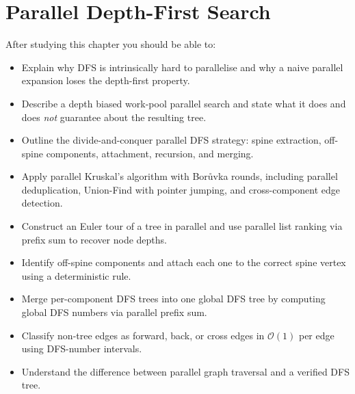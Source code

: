 

\chapter{Parallel Depth-First Search}

\begin{ppkey}
After studying this chapter you should be able to:
\begin{itemize}
  \item Explain why DFS is intrinsically hard to parallelise and why a
        naive parallel expansion loses the depth-first property.
  \item Describe a depth biased work-pool parallel search and state what it does and
        does \emph{not} guarantee about the resulting tree.
  \item Outline the divide-and-conquer parallel DFS strategy: spine
        extraction, off-spine components, attachment, recursion, and
        merging.
  \item Apply parallel Kruskal's algorithm with Bor{\r u}vka rounds,
        including parallel deduplication, Union-Find with pointer
        jumping, and cross-component edge detection.
  \item Construct an Euler tour of a tree in parallel and use parallel
        list ranking via prefix sum to recover node depths.
  \item Identify off-spine components and attach each one to the correct spine
        vertex using a deterministic rule.
  \item Merge per-component DFS trees into one global DFS tree by
        computing global DFS numbers via parallel prefix sum.
  \item Classify non-tree edges as forward, back, or cross edges in
        $\mathcal{O}(1)$ per edge using DFS-number intervals.
    \item Understand the difference between parallel graph traversal and a verified DFS tree.
\end{itemize}
\end{ppkey}


